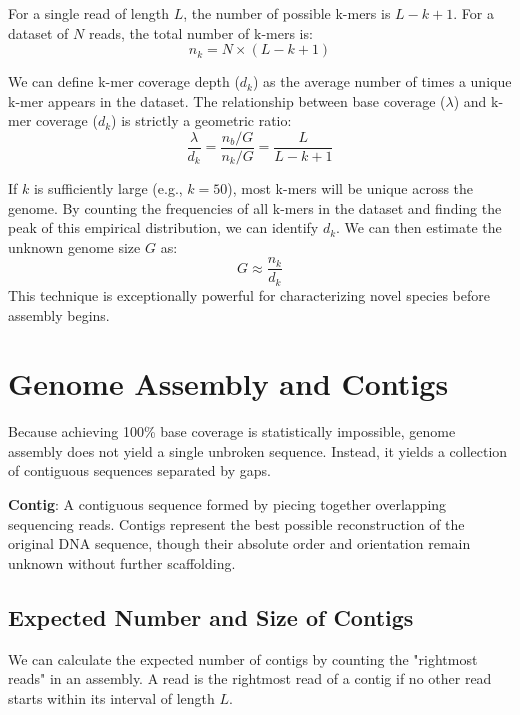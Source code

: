 For a single read of length \( L \), the number of possible k-mers is \( L - k + 1 \).
For a dataset of \( N \) reads, the total number of k-mers is:
\[ n_k = N \times (L - k + 1) \]

We can define k-mer coverage depth (\( d_k \)) as the average number of times a unique k-mer appears in the dataset. The relationship between base coverage (\( \lambda \)) and k-mer coverage (\( d_k \)) is strictly a geometric ratio:
\[ \frac{\lambda}{d_k} = \frac{n_b / G}{n_k / G} = \frac{L}{L - k + 1} \]

If \( k \) is sufficiently large (e.g., \( k=50 \)), most k-mers will be unique across the genome. By counting the frequencies of all k-mers in the dataset and finding the peak of this empirical distribution, we can identify \( d_k \). We can then estimate the unknown genome size \( G \) as:
\[ G \approx \frac{n_k}{d_k} \]
This technique is exceptionally powerful for characterizing novel species before assembly begins.


\section{Genome Assembly and Contigs}
Because achieving 100\% base coverage is statistically impossible, genome assembly does not yield a single unbroken sequence. Instead, it yields a collection of contiguous sequences separated by gaps.

\begin{important}
    \textbf{Contig}: A contiguous sequence formed by piecing together overlapping sequencing reads. Contigs represent the best possible reconstruction of the original DNA sequence, though their absolute order and orientation remain unknown without further scaffolding.
\end{important}

\subsection{Expected Number and Size of Contigs}
We can calculate the expected number of contigs by counting the "rightmost reads" in an assembly. A read is the rightmost read of a contig if no other read starts within its interval of length \( L \).

